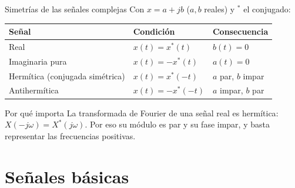 \documentclass[aspectratio=169,11pt]{beamer}
\begin{document}
\begin{frame}{Simetrías de las señales complejas}
  Con $x=a+jb$ ($a,b$ reales) y $^*$ el conjugado:
  \begin{center}
    \renewcommand{\arraystretch}{1.3}
    \begin{tabular}{@{}lll@{}}
      \toprule
      Señal & Condición & Consecuencia\\\midrule
      \alert{Real} & $x(t)=x^*(t)$ & $b(t)=0$\\
      \alert{Imaginaria pura} & $x(t)=-x^*(t)$ & $a(t)=0$\\
      \alert{Hermítica} (conjugada simétrica) & $x(t)=x^*(-t)$ & $a$ par, $b$ impar\\
      \alert{Antihermítica} & $x(t)=-x^*(-t)$ & $a$ impar, $b$ par\\\bottomrule
    \end{tabular}
  \end{center}
  \begin{block}{Por qué importa}
    La transformada de Fourier de una señal \alert{real} es \alert{hermítica}: $X(-j\omega)=X^*(j\omega)$. Por eso su módulo es par y su fase impar, y basta representar las frecuencias positivas.
  \end{block}
\end{frame}

\section{Señales básicas}
\end{document}
